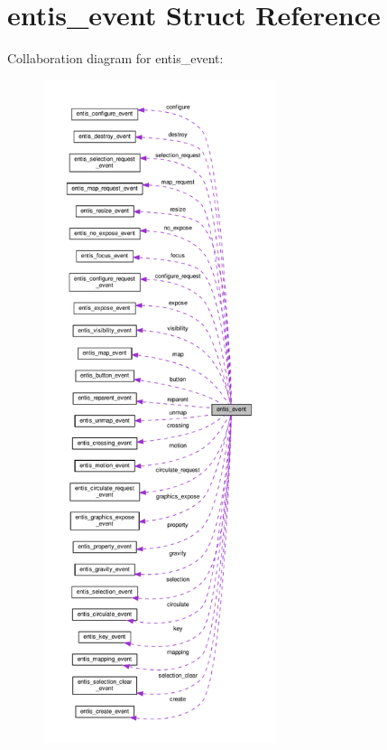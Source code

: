 \hypertarget{structentis__event}{}\section{entis\+\_\+event Struct Reference}
\label{structentis__event}


Collaboration diagram for entis\+\_\+event\+:
\nopagebreak
\begin{figure}[H]
\begin{center}
\leavevmode
\includegraphics[height=550pt]{structentis__event__coll__graph}
\end{center}
\end{figure}
